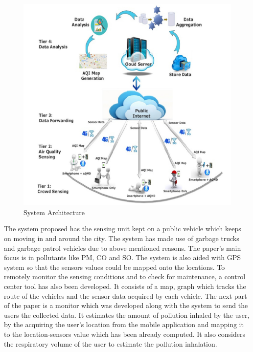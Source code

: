 \documentclass[10pt,a4paper]{report}
\begin{document}
\begin{figure}[h!]
  \centering
  \hspace*{-1.25cm}   
\includegraphics[scale=0.34]{images/fig3.png}
  \hspace*{-1.25cm}
  \caption{System Architecture}
  \label{arch}
\end{figure}


 The system proposed has the sensing unit kept on a public vehicle which keeps on moving in and around the city. The system has made use of garbage trucks and garbage patrol vehicles due to above mentioned reasons.
The paper's main focus is in pollutants like PM, CO and SO. The system is also aided with GPS system so that the sensors values could be mapped onto the locations. To remotely monitor the sensing conditions and to check for maintenance, a control center tool has also been developed. It consists of a map, graph which tracks the route of the vehicles and the sensor data acquired by each vehicle. The next part of the paper is a monitor which was developed along with the system to send the users the collected data. It estimates the amount of pollution inhaled by the user, by the acquiring the user's location from the mobile application and mapping it to the location-sensors value which has been already computed. It also considers the respiratory volume of the user to estimate the pollution inhalation.
\end{document}
